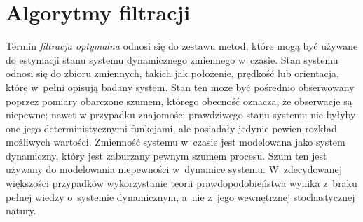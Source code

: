 \chapter{Algorytmy filtracji}
\label{cha:algorithms}
Termin \textit{filtracja optymalna} odnosi się do zestawu metod, które mogą być używane do estymacji stanu systemu dynamicznego zmiennego w~czasie. Stan systemu odnosi się do zbioru zmiennych, takich jak położenie, prędkość lub orientacja, które w~pełni opisują badany system. Stan ten może być pośrednio obserwowany poprzez pomiary obarczone szumem, którego obecność oznacza, że obserwacje są niepewne; nawet w przypadku znajomości prawdziwego stanu systemu nie byłyby one jego deterministycznymi funkcjami, ale posiadały jedynie pewien rozkład możliwych wartości. Zmienność systemu w~czasie jest modelowana jako system dynamiczny, który jest zaburzany pewnym szumem procesu. Szum ten jest używany do modelowania niepewności w~dynamice systemu. W~zdecydowanej większości przypadków wykorzystanie teorii prawdopodobieństwa wynika z~braku pełnej wiedzy o~systemie dynamicznym, a~nie z~jego wewnętrznej stochastycznej natury. \cite[1]{Sarka} \par 


